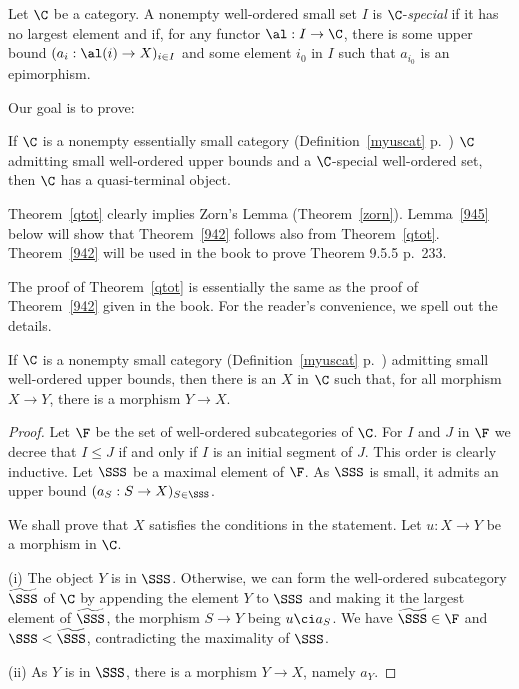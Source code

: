 \documentclass[12pt]{article}
\theoremstyle{remark}
\theoremstyle{definition}
\begin{document}
\begin{df} 
Let $\C$ be a category. A nonempty well-ordered small set $I$ is $\C$-{\em special} if it has no largest element and if, for any functor $\al:I\to\C$, there is some upper bound $(a_i:\al(i)\to X)_{i\in I}$ and some element $i_0$ in $I$ such that $a_{i_0}$ is an epimorphism. 
\end{df}

Our goal is to prove:

\begin{thm}
If $\C$ is a nonempty essentially small category (Definition~\ref{myuscat} p.~) $\C$ admitting small well-ordered upper bounds and a $\C$-special well-ordered set, then $\C$ has a quasi-terminal object.
\end{thm}

Theorem~\ref{qtot} clearly implies Zorn's Lemma (Theorem~\ref{zorn}). Lemma~\ref{945} below will show that Theorem~\ref{942} follows also from Theorem~\ref{qtot}. Theorem~\ref{942} will be used in the book to prove Theorem 9.5.5 p.~233.

The proof of Theorem~\ref{qtot} is essentially the same as the proof of Theorem~\ref{942} given in the book. For the reader's convenience, we spell out the details. 

\begin{lem}
If $\C$ is a nonempty small category (Definition~\ref{myuscat} p.~) admitting small well-ordered upper bounds, then there is an $X$ in $\C$ such that, for all morphism $X\to Y$, there is a morphism $Y\to X$.
\end{lem}

\begin{proof}
Let $\F$ be the set of well-ordered subcategories of $\C$. For $I$ and $J$ in $\F$ we decree that $I\le J$ if and only if $I$ is an initial segment of $J$. This order is clearly inductive. Let $\SSS$ be a maximal element of $\F$. As $\SSS$ is small, it admits an upper bound $(a_S:S\to X)_{S\in\SSS}$. 

We shall prove that $X$ satisfies the conditions in the statement. Let $u:X\to Y$ be a morphism in $\C$. 

\nn(i) The object $Y$ is in $\SSS$. Otherwise, we can form the well-ordered subcategory $\widetilde\SSS$ of $\C$ by appending the element $Y$ to $\SSS$ and making it the largest element of $\widetilde\SSS$, the morphism $S\to Y$ being $u\ci a_S$. We have $\widetilde\SSS\in\F$ and $\SSS<\widetilde\SSS$, contradicting the maximality of $\SSS$. 

\nn(ii) As $Y$ is in $\SSS$, there is a morphism $Y\to X$, namely $a_Y$.
\end{proof} 
\end{document}
